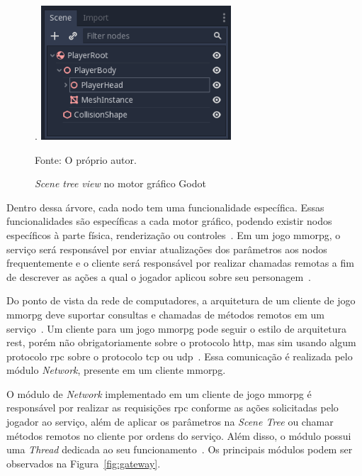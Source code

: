 \begin{figure}[htb!]
\caption{\textit{Scene tree view} no motor gráfico Godot}.
\label{fig:scene_tree}
\includegraphics[height=5cm]{img/cap2/scene_tree.png}
\centering

Fonte: O próprio autor.
\end{figure}



Dentro dessa árvore, cada nodo tem uma funcionalidade específica.
%
Essas funcionalidades são específicas a cada motor gráfico, podendo existir nodos específicos à parte física, renderização ou controles~\cite{godot_docs}.
%
Em um jogo \ac{mmorpg}, o serviço será responsável por enviar atualizações dos parâmetros aos nodos frequentemente e o cliente será responsável por realizar chamadas remotas a fim de descrever as ações a qual o jogador aplicou sobre seu personagem~\cite{photon_engine}.


Do ponto de vista da rede de computadores, a arquitetura de um cliente de jogo \ac{mmorpg} deve suportar consultas e chamadas de métodos remotos em um serviço~\cite{albion_online_unite}.
%
Um cliente para um jogo \ac{mmorpg} pode seguir o estilo de arquitetura \ac{rest}, porém não obrigatoriamente sobre o protocolo \ac{http}, mas sim usando algum protocolo \ac{rpc} sobre o protocolo \ac{tcp} ou \ac{udp}~\cite{albion_online_unite, stephenclarkewillson2017}.
%
Essa comunicação é realizada pelo módulo \textit{Network}, presente em um cliente \ac{mmorpg}.


O módulo de \textit{Network} implementado em um cliente de jogo \ac{mmorpg} é responsável por realizar as requisições \ac{rpc} conforme as ações solicitadas pelo jogador ao serviço, além de aplicar os parâmetros na \textit{Scene Tree} ou chamar métodos remotos no cliente por ordens do serviço.
%
Além disso, o módulo possui uma \textit{Thread} dedicada ao seu funcionamento~\cite{albion_online_unite}.
%
Os principais módulos podem ser observados na Figura~\ref{fig:gateway}.


